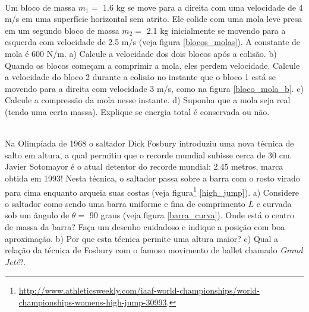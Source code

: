 \documentclass[12pt]{article}
\newenvironment{problem}[2][{\color{red}Problema}]{\begin{trivlist}
\item[\hskip \labelsep {\bfseries #1}\hskip \labelsep {\bfseries #2.}]}{\end{trivlist}}
\begin{document}
\begin{problem}{{\color{red}4}}
\\
Um bloco de massa $m_1=$ 1.6 kg se move para a direita com uma velocidade de 4 m/s em uma superfície horizontal sem atrito. Ele colide com uma mola leve presa em um segundo bloco de massa $m_2=$ 2.1 kg inicialmente se movendo para a esquerda com velocidade de 2.5 m/s (veja figura \ref{blocos_molas}). A constante de mola é 600 N/m. a) Calcule a velocidade dos dois blocos após a colisão. b) Quando os blocos começam a comprimir a mola, eles perdem velocidade. Calcule a velocidade do bloco 2 durante a colisão no instante que o bloco 1 está se movendo para a direita com velocidade 3 m/s, como na figura \ref{bloco_mola_b}. c) Calcule a compressão da mola nesse instante. d) Suponha que a mola seja real (tendo uma certa massa). Explique se energia total é conservada ou não.
\end{problem}

\begin{problem}{{\color{red}5}}
\\
Na Olimpíada de 1968 o saltador Dick Fosbury introduziu uma nova técnica de salto em altura, a qual permitiu que o recorde mundial subisse cerca de 30 cm. Javier Sotomayor é o atual detentor do recorde mundial: 2.45 metros, marca obtida em 1993! Nesta técnica, o saltador passa sobre a barra com o rosto virado para cima enquanto arqueia suas costas (veja figura\footnote{{\scriptsize \url{http://www.athleticsweekly.com/iaaf-world-championships/world-championships-womens-high-jump-30993}.}} \ref{high_jump}). a) Considere o saltador como sendo uma barra uniforme e fina de comprimento $L$ e curvada sob um ângulo de $\theta =$ 90 graus (veja figura \ref{barra_curva}). Onde está o centro de massa da barra? Faça um desenho cuidadoso e indique a posição com boa aproximação. b) Por que esta técnica permite uma altura maior? c) Qual a relação da técnica de Fosbury com o famoso movimento de ballet chamado \textit{Grand Jeté}?. 
\end{problem}
\end{document}
